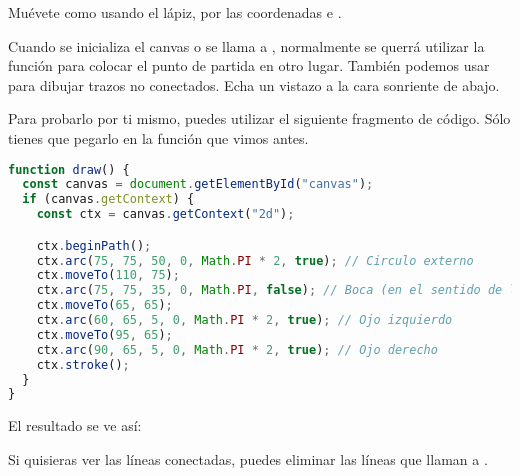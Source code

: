 \begin{description}
	 Muévete como usando el lápiz, por las coordenadas  e .
\end{description}
\vspace{0.5cm} %

Cuando se inicializa el canvas o se llama a , normalmente se querrá utilizar la función  para colocar el punto de partida en otro lugar. También podemos usar  para dibujar trazos no conectados. Echa un vistazo a la cara sonriente de abajo.

\newpage %
Para probarlo por ti mismo, puedes utilizar el siguiente fragmento de código. Sólo tienes que pegarlo en la función  que vimos antes.

\vspace{0.5cm} %
\begin{lstlisting}[language=TypeScript, style=mystyle]
function draw() {
  const canvas = document.getElementById("canvas");
  if (canvas.getContext) {
    const ctx = canvas.getContext("2d");

    ctx.beginPath();
    ctx.arc(75, 75, 50, 0, Math.PI * 2, true); // Circulo externo
    ctx.moveTo(110, 75);
    ctx.arc(75, 75, 35, 0, Math.PI, false); // Boca (en el sentido de las agujas del reloj)
    ctx.moveTo(65, 65);
    ctx.arc(60, 65, 5, 0, Math.PI * 2, true); // Ojo izquierdo
    ctx.moveTo(95, 65);
    ctx.arc(90, 65, 5, 0, Math.PI * 2, true); // Ojo derecho
    ctx.stroke();
  }
}
\end{lstlisting}
\vspace{0.5cm} %

El resultado se ve así:

\begin{center}
\end{center}
\vspace{0.5cm} %

Si quisieras ver las líneas conectadas, puedes eliminar las líneas que llaman a .

